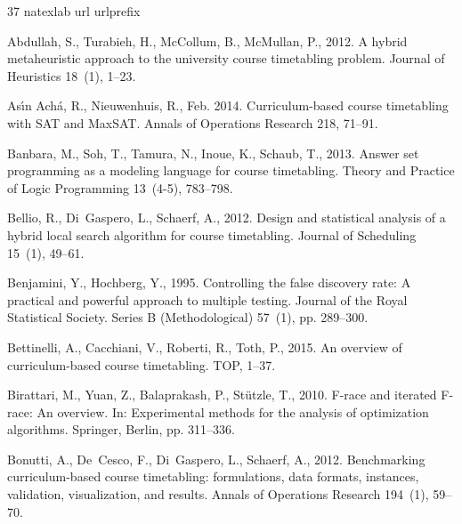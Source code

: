 \documentclass[authoryear,12pt]{article}
\begin{document}
\begin{thebibliography}{37}
\expandafter\ifx\csname natexlab\endcsname\relax\def\natexlab#1{#1}\fi
\expandafter\ifx\csname url\endcsname\relax
  \def\url#1{\texttt{#1}}\fi
\expandafter\ifx\csname urlprefix\endcsname\relax\def\urlprefix{URL }\fi

Abdullah, S., Turabieh, H., McCollum, B., McMullan, P., 2012. A hybrid
  metaheuristic approach to the university course timetabling problem. Journal
  of Heuristics 18~(1), 1--23.

{As\'{\i}n Ach\'{a}}, R., Nieuwenhuis, R., Feb. 2014. {Curriculum-based course
  timetabling with SAT and MaxSAT}. Annals of Operations Research 218, 71--91.

Banbara, M., Soh, T., Tamura, N., Inoue, K., Schaub, T., 2013. Answer set
  programming as a modeling language for course timetabling. Theory and
  Practice of Logic Programming 13~(4-5), 783--798.

Bellio, R., Di~Gaspero, L., Schaerf, A., 2012. Design and statistical analysis
  of a hybrid local search algorithm for course timetabling. Journal of
  Scheduling 15~(1), 49--61.

Benjamini, Y., Hochberg, Y., 1995. Controlling the false discovery rate: A
  practical and powerful approach to multiple testing. Journal of the Royal
  Statistical Society. Series B (Methodological) 57~(1), pp. 289--300.

Bettinelli, A., Cacchiani, V., Roberti, R., Toth, P., 2015. An overview of
  curriculum-based course timetabling. TOP, 1--37.

Birattari, M., Yuan, Z., Balaprakash, P., St{\"u}tzle, T., 2010. {F}-race and
  iterated {F}-race: An overview. In: Experimental methods for the analysis of
  optimization algorithms. Springer, Berlin, pp. 311--336.

Bonutti, A., De~Cesco, F., Di~Gaspero, L., Schaerf, A., 2012. Benchmarking
  curriculum-based course timetabling: formulations, data formats, instances,
  validation, visualization, and results. Annals of Operations Research
  194~(1), 59--70.


\end{thebibliography}
\end{document}
